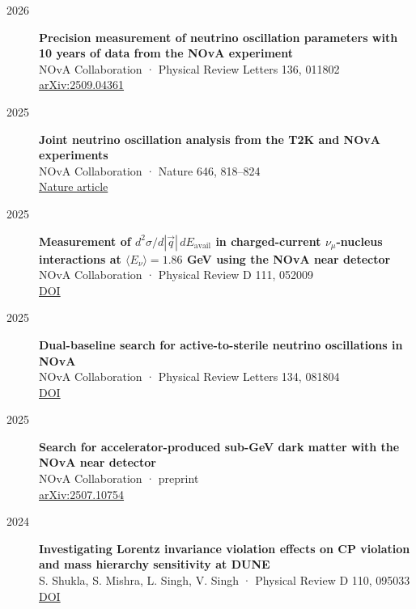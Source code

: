 \begin{description}

\item[2026] \textbf{Precision measurement of neutrino oscillation parameters with 10 years of data from the NOvA experiment} \\
NOvA Collaboration · Physical Review Letters 136, 011802 \\
\href{https://arxiv.org/abs/2509.04361}{arXiv:2509.04361}

\item[2025] \textbf{Joint neutrino oscillation analysis from the T2K and NOvA experiments} \\
NOvA Collaboration · Nature 646, 818--824 \\
\href{https://www.nature.com/articles/s41586-025-09599-3}{Nature article}

\item[2025] \textbf{Measurement of $d^2\sigma/d|\vec{q}|\,dE_{\text{avail}}$ in charged-current $\nu_\mu$-nucleus interactions at $\langle E_\nu\rangle = 1.86$ GeV using the NOvA near detector} \\
NOvA Collaboration · Physical Review D 111, 052009 \\
\href{https://doi.org/10.1103/PhysRevD.111.052009}{DOI}

\item[2025] \textbf{Dual-baseline search for active-to-sterile neutrino oscillations in NOvA} \\
NOvA Collaboration · Physical Review Letters 134, 081804 \\
\href{https://doi.org/10.1103/PhysRevLett.134.081804}{DOI}

\item[2025] \textbf{Search for accelerator-produced sub-GeV dark matter with the NOvA near detector} \\
NOvA Collaboration · preprint \\
\href{https://arxiv.org/abs/2507.10754}{arXiv:2507.10754}

\item[2024] \textbf{Investigating Lorentz invariance violation effects on CP violation and mass hierarchy sensitivity at DUNE} \\
S. Shukla, S. Mishra, L. Singh, V. Singh · Physical Review D 110, 095033 \\
\href{https://doi.org/10.1103/PhysRevD.110.095033}{DOI}


\end{description}
